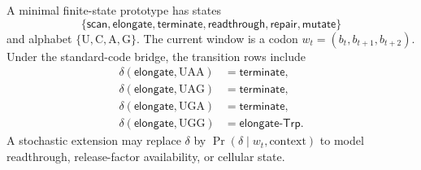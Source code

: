 \begin{definition}
\label{def:philosophy-finite-state-stop-boundary-prototype}
A minimal finite-state prototype has states
$$
  \{\mathsf{scan},\mathsf{elongate},\mathsf{terminate},
    \mathsf{readthrough},\mathsf{repair},\mathsf{mutate}\}
$$
and alphabet $\{\mathrm{U},\mathrm{C},\mathrm{A},\mathrm{G}\}$. The
current window is a codon $w_{t}=(b_{t},b_{t+1},b_{t+2})$. Under the
standard-code bridge, the transition rows include
$$
\begin{aligned}
  \delta(\mathsf{elongate},\mathrm{UAA}) &= \mathsf{terminate},\\
  \delta(\mathsf{elongate},\mathrm{UAG}) &= \mathsf{terminate},\\
  \delta(\mathsf{elongate},\mathrm{UGA}) &= \mathsf{terminate},\\
  \delta(\mathsf{elongate},\mathrm{UGG}) &= \mathsf{elongate\text{-}Trp}.
\end{aligned}
$$
A stochastic extension may replace $\delta$ by
$\Pr(\delta\mid w_{t},\mathrm{context})$ to model readthrough,
release-factor availability, or cellular state.
\end{definition}

